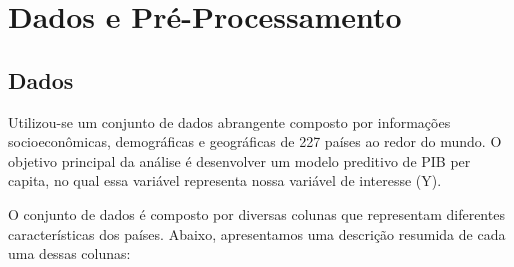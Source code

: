 \documentclass[conference]{IEEEtran}
\begin{document}
\section{Dados e Pré-Processamento}

\subsection{Dados}

Utilizou-se um conjunto de dados abrangente composto por informações socioeconômicas, demográficas e geográficas de 227 países ao redor do mundo. O objetivo principal da análise é desenvolver um modelo preditivo de PIB per capita, no qual essa variável representa nossa variável de interesse (Y).

O conjunto de dados é composto por diversas colunas que representam diferentes características dos países. Abaixo, apresentamos uma descrição resumida de cada uma dessas colunas:
\end{document}

